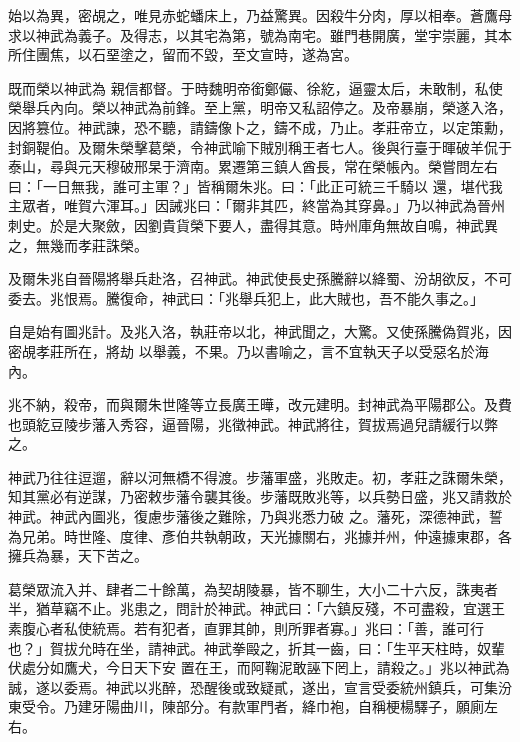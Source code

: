\begin{pinyinscope}
 始以為異，密覘之，唯見赤蛇蟠床上，乃益驚異。因殺牛分肉，厚以相奉。蒼鷹母求以神武為義子。及得志，以其宅為第，號為南宅。雖門巷開廣，堂宇崇麗，其本所住團焦，以石堊塗之，留而不毀，至文宣時，遂為宮。



 既而榮以神武為
 親信都督。于時魏明帝銜鄭儼、徐紇，逼靈太后，未敢制，私使榮舉兵內向。榮以神武為前鋒。至上黨，明帝又私詔停之。及帝暴崩，榮遂入洛，因將篡位。神武諫，恐不聽，請鑄像卜之，鑄不成，乃止。孝莊帝立，以定策勳，封銅鞮伯。及爾朱榮擊葛榮，令神武喻下賊別稱王者七人。後與行臺于暉破羊侃于泰山，尋與元天穆破邢杲于濟南。累遷第三鎮人酋長，常在榮帳內。榮嘗問左右曰：「一日無我，誰可主軍？」皆稱爾朱兆。曰：「此正可統三千騎以
 還，堪代我主眾者，唯賀六渾耳。」因誡兆曰：「爾非其匹，終當為其穿鼻。」乃以神武為晉州刺史。於是大聚斂，因劉貴貨榮下要人，盡得其意。時州庫角無故自鳴，神武異之，無幾而孝莊誅榮。



 及爾朱兆自晉陽將舉兵赴洛，召神武。神武使長史孫騰辭以絳蜀、汾胡欲反，不可委去。兆恨焉。騰復命，神武曰：「兆舉兵犯上，此大賊也，吾不能久事之。」



 自是始有圖兆計。及兆入洛，執莊帝以北，神武聞之，大驚。又使孫騰偽賀兆，因密覘孝莊所在，將劫
 以舉義，不果。乃以書喻之，言不宜執天子以受惡名於海內。



 兆不納，殺帝，而與爾朱世隆等立長廣王曄，改元建明。封神武為平陽郡公。及費也頭紇豆陵步藩入秀容，逼晉陽，兆徵神武。神武將往，賀拔焉過兒請緩行以弊之。



 神武乃往往逗遛，辭以河無橋不得渡。步藩軍盛，兆敗走。初，孝莊之誅爾朱榮，知其黨必有逆謀，乃密敕步藩令襲其後。步藩既敗兆等，以兵勢日盛，兆又請救於神武。神武內圖兆，復慮步藩後之難除，乃與兆悉力破
 之。藩死，深德神武，誓為兄弟。時世隆、度律、彥伯共執朝政，天光據關右，兆據并州，仲遠據東郡，各擁兵為暴，天下苦之。



 葛榮眾流入并、肆者二十餘萬，為契胡陵暴，皆不聊生，大小二十六反，誅夷者半，猶草竊不止。兆患之，問計於神武。神武曰：「六鎮反殘，不可盡殺，宜選王素腹心者私使統焉。若有犯者，直罪其帥，則所罪者寡。」兆曰：「善，誰可行也？」賀拔允時在坐，請神武。神武拳毆之，折其一齒，曰：「生平天柱時，奴輩伏處分如鷹犬，今日天下安
 置在王，而阿鞠泥敢誣下罔上，請殺之。」兆以神武為誠，遂以委焉。神武以兆醉，恐醒後或致疑貳，遂出，宣言受委統州鎮兵，可集汾東受令。乃建牙陽曲川，陳部分。有款軍門者，絳巾袍，自稱梗楊驛子，願廁左右。




\end{pinyinscope}
